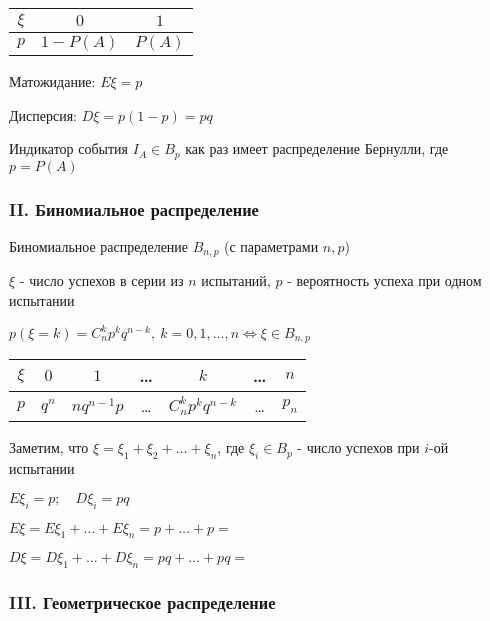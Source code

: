 \documentclass[12pt]{article}
\begin{document}
    \smallvspace

    \begin{tabular}{c|c|c}
        $\xi$ & $0$        & $1$    \\
        \hline
        $p$   & $1 - P(A)$ & $P(A)$
    \end{tabular}

    \smallvspace

    Матожидание: $E\xi = p$

    Дисперсия: $D\xi = p(1 - p) = pq$

    \Ex Индикатор события $I_A \in B_p$ как раз имеет распределение Бернулли, где $p = P(A)$

    \subsubsection{II. Биномиальное распределение}

    \hypertarget{binomialdistributionproperties}{}

    Биномиальное распределение $B_{n,p}$ (с параметрами $n, p$)

    $\xi$ - число успехов в серии из $n$ испытаний, $p$ - вероятность успеха при одном испытании

    $p(\xi = k) = C^k_n p^k q^{n - k}, \ k = 0, 1, \dots, n \Longleftrightarrow \xi \in B_{n,p}$

    \smallvspace

    \begin{tabular}{c|c|c|c|c|c|c}
        $\xi$ & $0$        & $1$ & \dots & $k$ & \dots & $n$    \\
        \hline
        $p$   & $q^n$ & $n q^{n - 1} p$ & \dots & $C^k_n p^k q^{n - k}$ & \dots & $p_n$
    \end{tabular}

    \smallvspace

    Заметим, что $\xi = \xi_1 + \xi_2 + \dots + \xi_n$, где $\xi_i \in B_p$ - число успехов при $i$-ой испытании

    $E\xi_i = p; \quad D\xi_i = pq$

    $E\xi = E\xi_1 + \dots + E\xi_n = p + \dots + p = $ 

    $D\xi = D\xi_1 + \dots + D\xi_n = pq + \dots + pq = $ 

    
    \subsubsection{III. Геометрическое распределение}
\end{document}
